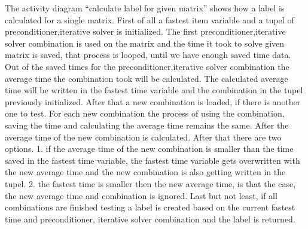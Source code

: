 \documentclass[parskip=full]{scrartcl}
\begin{document}
\newpage
\begin{figure}[h]
\begin{center}

\label{Activity Diagrams}
\end{center}
\end{figure}
\newpage

The activity diagram ``calculate label for given matrix'' shows how a \gls{label} is calculated for a single matrix.
First of all a fastest item variable and a \gls{tupel} of \gls{preconditioner},\gls{iterative solver} is initialized.
The first \gls{preconditioner},\gls{iterative solver} combination is used on the matrix and the time it took to solve given matrix is saved, that process is looped, until we have enough saved time data.
Out of the saved times for the \gls{preconditioner},\gls{iterative solver} combination the average time the combination took will be calculated.
The calculated average time will be written in the fastest time variable and the combination in the \gls{tupel} previously initialized.
After that a new combination is loaded, if there is another one to test.
For each new combination the process of using the combination, saving the time and calculating the average time remains the same.
After the average time of the new combination is calculated.
After that there are two options. 
1. if the average time of the new combination is smaller than the time saved in the fastest time variable, the fastest time variable gets overwritten with the new average time and the new combination is also getting written in the \gls{tupel}.
2. the fastest time is smaller then the new average time, is that the case, the new average time and combination is ignored.
Last but not least, if all combinations are finished testing a \gls{label} is created based on the current fastest time and \gls{preconditioner}, \gls{iterative solver} combination and the \gls{label} is returned.
\end{document}
